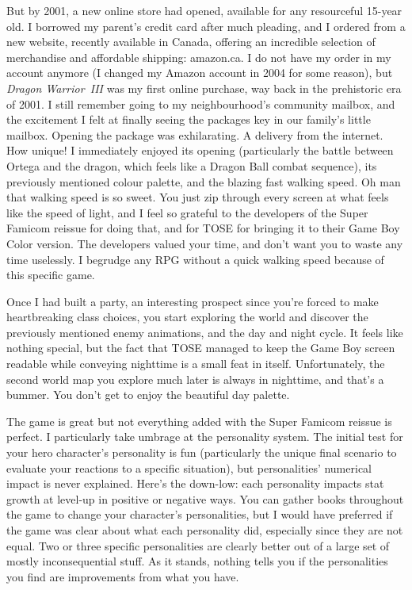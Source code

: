 \documentclass{book}
\begin{document}
But by 2001, a new online store had opened, available for any resourceful 15-year old. I borrowed my parent’s credit card after much pleading, and I ordered from a new website, recently available in Canada, offering an incredible selection of merchandise and affordable shipping: amazon.ca. I do not have my order in my account anymore (I changed my Amazon account in 2004 for some reason), but \emph{Dragon Warrior III} was my first online purchase, way back in the prehistoric era of 2001. I still remember going to my neighbourhood’s community mailbox, and the excitement I felt at finally seeing the packages key in our family’s little mailbox. Opening the package was exhilarating. A delivery from the internet. How unique! I immediately enjoyed its opening (particularly the battle between Ortega and the dragon, which feels like a Dragon Ball combat sequence), its previously mentioned colour palette, and the blazing fast walking speed. Oh man that walking speed is so sweet. You just zip through every screen at what feels like the speed of light, and I feel so grateful to the developers of the Super Famicom reissue for doing that, and for TOSE for bringing it to their Game Boy Color version. The developers valued your time, and don’t want you to waste any time uselessly. I begrudge any RPG without a quick walking speed because of this specific game.

Once I had built a party, an interesting prospect since you’re forced to make heartbreaking class choices, you start exploring the world and discover the previously mentioned enemy animations, and the day and night cycle. It feels like nothing special, but the fact that TOSE managed to keep the Game Boy screen readable while conveying nighttime is a small feat in itself. Unfortunately, the second world map you explore much later is always in nighttime, and that’s a bummer. You don’t get to enjoy the beautiful day palette.

The game is great but not everything added with the Super Famicom reissue is perfect. I particularly take umbrage at the personality system. The initial test for your hero character’s personality is fun (particularly the unique final scenario to evaluate your reactions to a specific situation), but personalities’ numerical impact is never explained. Here’s the down-low: each personality impacts stat growth at level-up in positive or negative ways. You can gather books throughout the game to change your character’s personalities, but I would have preferred if the game was clear about what each personality did, especially since they are not equal. Two or three specific personalities are clearly better out of a large set of mostly inconsequential stuff. As it stands, nothing tells you if the personalities you find are improvements from what you have.
\end{document}
